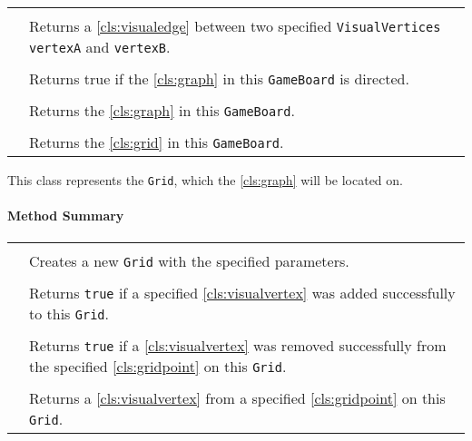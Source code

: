 \begin{longtable}{Lp{10cm}}
	 \\
	& Returns a \ref{cls:visualedge} between two specified \texttt{VisualVertices} \texttt{vertexA} and \texttt{vertexB}. \\
	 \\
	& Returns true if the \ref{cls:graph} in this \texttt{GameBoard} is directed. \\
	 \\
	& Returns the \ref{cls:graph} in this \texttt{GameBoard}. \\
	 \\
	& Returns the \ref{cls:grid} in this \texttt{GameBoard}. \\
	\hline
\end{longtable}

This class represents the \texttt{Grid}, which the \ref{cls:graph} will be located on. \\

\centerdash

\paragraph*{Method Summary}
\paragraph*{}
\begin{longtable}{Lp{10cm}}
	\startmethodtable
	 \\
	& Creates a new \texttt{Grid} with the specified parameters. \\
	 \\
	& Returns \texttt{true} if a specified \ref{cls:visualvertex} was added successfully to this \texttt{Grid}. \\
	 \\
	& Returns \texttt{true} if a \ref{cls:visualvertex} was removed successfully from the specified \ref{cls:gridpoint} on this \texttt{Grid}. \\
	 \\
	& Returns a \ref{cls:visualvertex} from a specified \ref{cls:gridpoint} on this \texttt{Grid}. \\
	\hline
\end{longtable}

